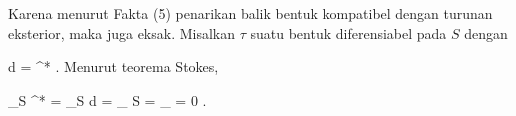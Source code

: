 Karena menurut
Fakta (5)
penarikan balik bentuk kompatibel dengan turunan eksterior, maka
\mathl{\varphi^*\omega}{} juga eksak. Misalkan $\tau$ suatu bentuk diferensiabel pada $S$ dengan

\mavergleichskettedisp
{\vergleichskette
{d \tau
}
{ =} { \varphi^* \omega
}
{ } {
}
{ } {
}
{ } {
}
}
{}{}{.}
Menurut
teorema Stokes,

\mavergleichskettedisp
{\vergleichskette
{ \int_S \varphi^* \omega
}
{ =} { \int_S d \tau
}
{ =} { \int_{ \partial S } \tau
}
{ =} { \int_\emptyset \tau
}
{ =} { 0
}
}
{}{}{.}
